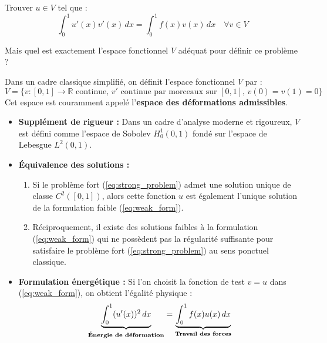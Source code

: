 \begin{definition}
Trouver $u \in V$ tel que :
\begin{equation}
\int_{0}^{1} u'(x) v'(x) \, dx = \int_{0}^{1} f(x) v(x) \, dx \quad \forall v \in V
\label{eq:weak_form}
\end{equation}
\end{definition}

Mais quel est exactement l'espace fonctionnel $V$ adéquat pour définir ce problème ?

\begin{definition}
Dans un cadre classique simplifié, on définit l'espace fonctionnel $V$ par :
$$V = \{ v: [0, 1] \to \mathbb{R} \text{ continue}, \, v' \text{ continue par morceaux sur } [0,1], \, v(0) = v(1) = 0 \}$$
Cet espace est couramment appelé l'\textbf{espace des déformations admissibles}.
\end{definition}

\begin{remarque}
\begin{itemize}
    \item \textbf{Supplément de rigueur :} Dans un cadre d'analyse moderne et rigoureux, $V$ est défini comme l'espace de Sobolev $H_0^1(0, 1)$ fondé sur l'espace de Lebesgue $L^2(0, 1)$.
    \item \textbf{Équivalence des solutions :}
    \begin{enumerate}
        \item Si le problème fort (\ref{eq:strong_problem}) admet une solution unique de classe $C^2([0, 1])$, alors cette fonction $u$ est également l'unique solution de la formulation faible (\ref{eq:weak_form}).
        \item Réciproquement, il existe des solutions faibles à la formulation (\ref{eq:weak_form}) qui ne possèdent pas la régularité suffisante pour satisfaire le problème fort (\ref{eq:strong_problem}) au sens ponctuel classique.
    \end{enumerate}
    \item \textbf{Formulation énergétique :} Si l'on choisit la fonction de test $v = u$ dans (\ref{eq:weak_form}), on obtient l'égalité physique :
    $$\underbrace{\int_{0}^{1} (u'(x))^2 \, dx}_{\text{\textbf{Énergie de déformation}}} = \underbrace{\int_{0}^{1} f(x)u(x) \, dx}_{\text{\textbf{Travail des forces}}}$$
\end{itemize}
\end{remarque}

